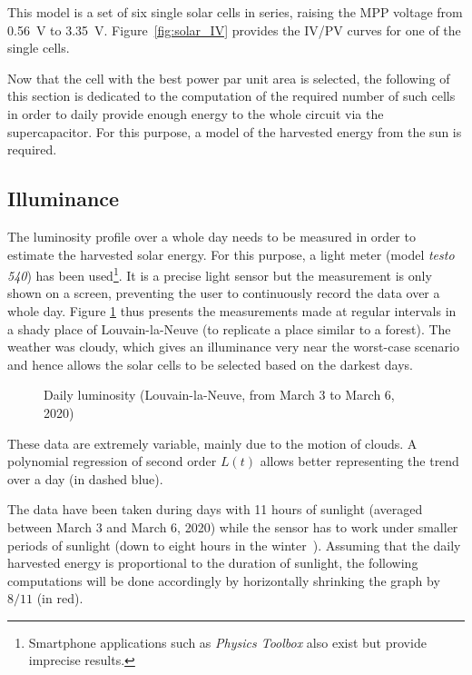 \documentclass{EPL-master-thesis-covers-EN}
\newcommand{\te}[1]{\textrm{#1}}
\begin{document}
This model is a set of six single solar cells in series, raising the MPP voltage from \SI{0.56}{V} to \SI{3.35}{V}. Figure~\ref{fig:solar_IV} provides the IV/PV curves for one of the single cells.

Now that the cell with the best power par unit area is selected, the following of this section is dedicated to the computation of the required number of such cells in order to daily provide enough energy to the whole circuit via the supercapacitor. For this purpose, a model of the harvested energy from the sun is required.


\subsection*{Illuminance}

The luminosity profile over a whole day needs to be measured in order to estimate the harvested solar energy. For this purpose, a light meter (model \textit{testo 540}) has been used\footnote{Smartphone applications such as \textit{Physics Toolbox} also exist but provide imprecise results.}. It is a precise light sensor but the measurement is only shown on a screen, preventing the user to continuously record the data over a whole day. Figure \ref{fig:daily_luminosity} thus presents the measurements made at regular intervals in a shady place of Louvain-la-Neuve (to replicate a place similar to a forest). The weather was cloudy, which gives an illuminance very near the worst-case scenario and hence allows the solar cells to be selected based on the darkest days.

\begin{figure}[H]
    \centering
    
    \caption{Daily luminosity (Louvain-la-Neuve, from March 3 to March 6, 2020)}
    \label{fig:daily_luminosity}
\end{figure}

These data are extremely variable, mainly due to the motion of clouds. A polynomial regression of second order $L(t)$ allows better representing the trend over a day (in dashed blue).

The data have been taken during days with 11 hours of sunlight (averaged between March 3 and March 6, 2020) while the sensor has to work under smaller periods of sunlight (down to eight hours in the winter~\cite{sunlight}). Assuming that the daily harvested energy is proportional to the duration of sunlight, the following computations will be done accordingly by horizontally shrinking the graph by $8/11$ (in red).
\end{document}
